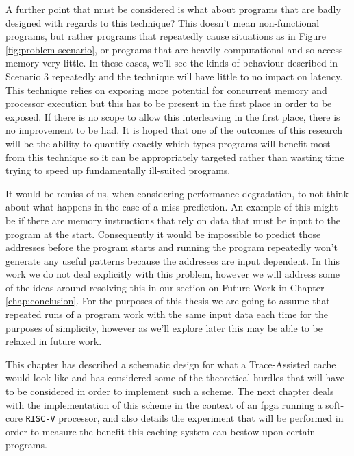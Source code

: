 A further point that must be considered is what about programs that are badly designed with regards to this technique? This doesn't mean non-functional programs, but rather programs that repeatedly cause situations as in Figure \ref{fig:problem-scenario}, or programs that are heavily computational and so access memory very little. In these cases, we'll see the kinds of behaviour described in Scenario 3 repeatedly and the technique will have little to no impact on latency. This technique relies on exposing more potential for concurrent memory and processor execution but this has to be present in the first place in order to be exposed. If there is no scope to allow this interleaving in the first place, there is no improvement to be had. It is hoped that one of the outcomes of this research will be the ability to quantify exactly which types programs will benefit most from this technique so it can be appropriately targeted rather than wasting time trying to speed up fundamentally ill-suited programs. 

It would be remiss of us, when considering performance degradation, to not think about what happens in the case of a miss-prediction. An example of this might be if there are memory instructions that rely on data that must be input to the program at the start. Consequently it would be impossible to predict those addresses before the program starts and running the program repeatedly won't generate any useful patterns because the addresses are input dependent. In this work we do not deal explicitly with this problem, however we will address some of the ideas around resolving this in our section on Future Work in Chapter \ref{chap:conclusion}. For the purposes of this thesis we are going to assume that repeated runs of a program work with the same input data each time for the purposes of simplicity, however as we'll explore later this may be able to be relaxed in future work.

This chapter has described a schematic design for what a Trace-Assisted cache would look like and has considered some of the theoretical hurdles that will have to be considered in order to implement such a scheme. The next chapter deals with the implementation of this scheme in the context of an \gls{fpga} running a soft-core \texttt{RISC-V} processor, and also details the experiment that will be performed in order to measure the benefit this caching system can bestow upon certain programs. 